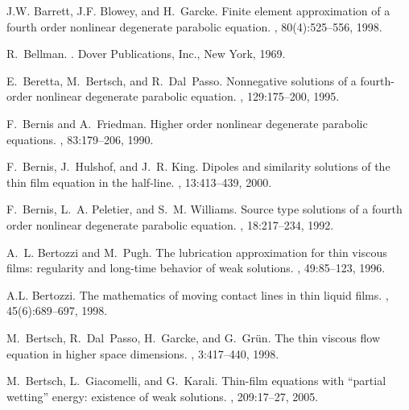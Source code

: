 \documentclass{article}%
\begin{document}
{  
\begin{thebibliography}{10}

J.W. Barrett, J.F. Blowey, and H.~Garcke.
\newblock Finite element approximation of a fourth order nonlinear degenerate
  parabolic equation.
, 80(4):525--556, 1998.

R.~Bellman.
.
\newblock Dover Publications, Inc., New York, 1969.

E.~Beretta, M.~Bertsch, and R.~Dal~Passo.
\newblock Nonnegative solutions of a fourth-order nonlinear degenerate
  parabolic equation.
, 129:175--200, 1995.

F.~Bernis and A.~Friedman.
\newblock Higher order nonlinear degenerate parabolic equations.
, 83:179--206, 1990.

F.~Bernis, J.~Hulshof, and J.~R. King.
\newblock Dipoles and similarity solutions of the thin film equation in the
  half-line.
, 13:413--439, 2000.

F.~Bernis, L.~A. Peletier, and S.~M. Williams.
\newblock Source type solutions of a fourth order nonlinear degenerate
  parabolic equation.
, 18:217--234, 1992.

A.~L. Bertozzi and M.~Pugh.
\newblock The lubrication approximation for thin viscous films: regularity and
  long-time behavior of weak solutions.
, 49:85--123, 1996.

A.L. Bertozzi.
\newblock The mathematics of moving contact lines in thin liquid films.
, 45(6):689--697, 1998.

M.~Bertsch, R.~Dal~Passo, H.~Garcke, and G.~Gr{\"u}n.
\newblock The thin viscous flow equation in higher space dimensions.
, 3:417--440, 1998.

M.~Bertsch, L.~Giacomelli, and G.~Karali.
\newblock Thin-film equations with ``partial wetting'' energy: existence of
  weak solutions.
, 209:17--27, 2005.


\end{thebibliography}}
\end{document}
